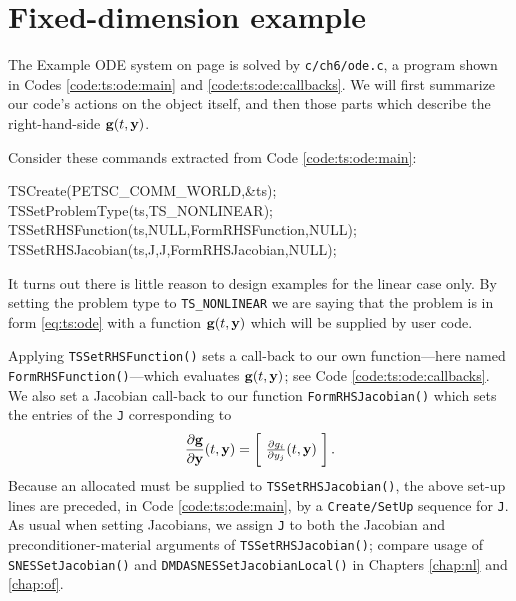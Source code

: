 \section{Fixed-dimension example }

The Example ODE system on page \pageref{ex:ts:odeeasy} is solved by \texttt{c/ch6/ode.c}, a program shown in Codes \ref{code:ts:ode:main} and \ref{code:ts:ode:callbacks}.  We will first summarize our code's actions on the \pTS object itself, and then those parts which describe the right-hand-side $\mathbf{g}(t,\mathbf{y})$.


Consider these commands extracted from Code \ref{code:ts:ode:main}:
\begin{code}
  TSCreate(PETSC_COMM_WORLD,&ts);
  TSSetProblemType(ts,TS_NONLINEAR);
  TSSetRHSFunction(ts,NULL,FormRHSFunction,NULL);
  TSSetRHSJacobian(ts,J,J,FormRHSJacobian,NULL);
\end{code}
It turns out there is little reason to design \PETSc examples for the linear case only.  By setting the problem type to \texttt{TS\_NONLINEAR} we are saying that the problem is in form \eqref{eq:ts:ode} with a function $\mathbf{g}(t,\mathbf{y})$ which will be supplied by user code.

Applying \texttt{TSSetRHSFunction()} sets a call-back to our own function---here named \texttt{FormRHSFunction()}---which evaluates $\mathbf{g}(t,\mathbf{y})$; see Code \ref{code:ts:ode:callbacks}.  We also set a Jacobian call-back to our function \texttt{FormRHSJacobian()} which sets the entries of the \pMat \texttt{J} corresponding to
    $$\frac{\partial \mathbf{g}}{\partial \mathbf{y}}(t,\mathbf{y}) = \begin{bmatrix}\phantom{\bigg|} \frac{\partial g_i}{\partial y_j}(t,\mathbf{y}) \phantom{\bigg|}\end{bmatrix}.$$
Because an allocated \pMat must be supplied to \texttt{TSSetRHSJacobian()}, the above \pTS set-up lines are preceded, in Code \ref{code:ts:ode:main}, by a \texttt{Create/SetUp} sequence for \pMat \texttt{J}.  As usual when setting Jacobians, we assign \texttt{J} to both the Jacobian and preconditioner-material arguments of \texttt{TSSetRHSJacobian()}; compare usage of \texttt{SNESSetJacobian()} and \texttt{DMDASNESSetJacobianLocal()} in Chapters \ref{chap:nl} and \ref{chap:of}.

